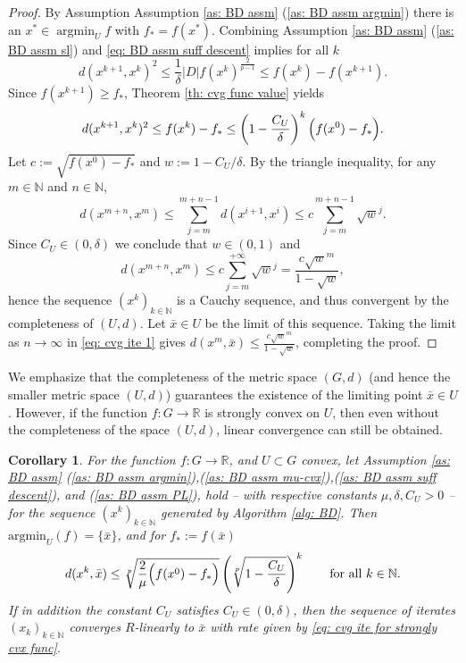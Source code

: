 \documentclass{article}
\theoremstyle{plain}\newtheorem{theorem}{Theorem}[section]
\theoremstyle{plain}\newtheorem{definition}[theorem]{Definition}
\theoremstyle{plain}\newtheorem{lemma}[theorem]{Lemma}
\theoremstyle{definition}\newtheorem{remark}[theorem]{Remark}
\theoremstyle{definition}\newtheorem{example}[theorem]{Example}
\theoremstyle{plain}\newtheorem{proposition}[theorem]{Proposition}
\theoremstyle{plain}\newtheorem{inference}[theorem]{Inference}
\theoremstyle{plain}\newtheorem{corollary}[theorem]{Corollary}
\theoremstyle{plain}\newtheorem{assumption}[theorem]{Assumption}
\DeclareMathOperator*{\argmin}{argmin}
\newcommand{\xbar}{\bar{x}}
\newcommand{\bbN}{\mathbb{N}}
\newcommand{\Nbb}{\mathbb{N}}
\begin{document}
\begin{proof}
    By Assumption Assumption \ref{as: BD assm} (\ref{as: BD assm argmin}) there is an $x^*\in\argmin_U f$ with $f_*=f(x^*)$.
    Combining Assumption \ref{as: BD assm} (\ref{as: BD assm sl}) and \eqref{eq: BD assm suff descent} implies for all $k$
    $$
    d(x^{k+1},x^k)^2\leq\frac{1}{\delta}|D|f(x^k)^{\frac{2}{p-1}}\leq f(x^k)-f(x^{k+1}).
    $$
    Since $f(x^{k+1})\geq f_*$, Theorem \ref{th: cvg func value} yields
    $$
    d(x^{k+1},x^k)^2\leq f(x^k)-f_*\leq\left(1-\frac{C_U}{\delta}\right)^k\Bigl(f(x^0)-f_*\Bigr).
    $$
    Let $c:=\sqrt{f(x^0)-f_*}$ and $w:=1-C_U/\delta$. By the triangle inequality, for any $m\in\bbN$ and $n\in\bbN$,
    $$
    d(x^{m+n},x^m)\leq\sum_{j=m}^{m+n-1}d(x^{i+1},x^i)\leq c\sum_{j=m}^{m+n-1}\sqrt{w}^j.
    $$
    Since $C_U\in(0,\delta)$ we conclude that $w\in(0,1)$ and
    \begin{equation}\label{eq: cvg ite 1}
        d(x^{m+n},x^m)\leq c\sum_{j=m}^{+\infty}\sqrt{w}^j=\frac{c\sqrt{w}^m}{1-\sqrt{w}},
    \end{equation}
    hence the sequence $(x^k)_{k\in\bbN}$ is a Cauchy sequence, and thus convergent by the completeness of $(U,d)$. Let $\xbar\in U$ be the limit of this sequence. Taking the limit as $n\to\infty$ in \eqref{eq: cvg ite 1} gives $d(x^m, \xbar)\leq\frac{c\sqrt{w}^m}{1-\sqrt{w}}$, completing the proof.
\end{proof}
We emphasize that the completeness of the metric space $(G,d)$ (and hence the smaller metric space $(U, d)$) guarantees the existence of the limiting point $\xbar\in U$. However, if the function $f:G\to\mathbb{R}$ is strongly convex on $U$, then even without the completeness of the space $(U,d)$, linear convergence can still be obtained.
\begin{corollary}\label{cl: cvg ite for strongly cvx func}
    For the function $f:G\to\mathbb{R}$, and $U\subset G$ convex,
    let Assumption \ref{as: BD assm} (\ref{as: BD assm argmin}),(\ref{as: BD assm mu-cvx}),(\ref{as: BD assm suff descent}), and (\ref{as: BD assm PL}), hold -- with respective constants $\mu, \delta, C_U>0$ --  for the sequence $(x^k)_{k\in\bbN}$ generated by Algorithm \ref{alg: BD}.  Then  $\mathrm{argmin}_U(f)=\{\bar{x}\}$, and for $f_*:=f(\xbar)$
    \begin{equation}\label{eq: cvg ite for strongly cvx func}
        d(x^k,\bar{x})\leq\sqrt[p]{\frac{2}{\mu}\Bigl(f(x^0)-f_*\Bigr)}\left(\sqrt[p]{1-\frac{C_U}{\delta}}\right)^k \qquad\text{for all}\,\,k\in\Nbb.
    \end{equation}
    If in addition the constant $C_U$ satisfies $C_U\in(0,\delta)$, then the sequence of iterates $(x_k)_{k\in\bbN}$ converges $R$-linearly to $\bar{x}$ with rate given by \eqref{eq: cvg ite for strongly cvx func}.
\end{corollary}
\end{document}
